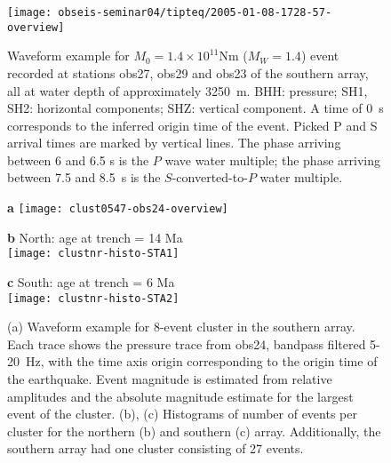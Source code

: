 \documentclass[reviewcopy]{elsarticle}
\renewcommand{\includegraphics}[2][]{\fbox{#2}}
\begin{document}
\begin{figure}
\centering
\texttt{[image: obseis-seminar04/tipteq/2005-01-08-1728-57-overview]}
\caption{Waveform example for $M_0=1.4\times 10^{11}$Nm ($M_W=1.4$)
  event recorded at stations obs27, obs29 and obs23 of the southern
  array, all at water depth of approximately 3250~m. BHH: pressure;
  SH1, SH2: horizontal components; SHZ: vertical component. A time of
  0~s corresponds to the inferred origin time of the event.  Picked P
  and S arrival times are marked by vertical lines. The phase arriving
  between 6 and 6.5 s is the $P$ wave water multiple; the phase
  arriving between 7.5 and 8.5~s is the $S$-converted-to-$P$ water
  multiple. %
}
\label{fig:waveform}
\end{figure}


\begin{figure}
{\sf \bf a}
\texttt{[image: clust0547-obs24-overview]}\\[1cm]

\parbox{0.5\textwidth}{{\sf \bf b} North: age at trench = 14 Ma \\
\texttt{[image: clustnr-histo-STA1]}}
\parbox{0.5\textwidth}{{\sf \bf c} South:  age at trench = 6 Ma\\
\texttt{[image: clustnr-histo-STA2]}}

\caption{(a) Waveform example for 8-event cluster in the southern
  array.  Each trace shows the pressure trace from obs24, bandpass
  filtered 5-20~Hz, with the time axis origin corresponding to the
  origin time of the earthquake.  Event magnitude is estimated from
  relative amplitudes and the absolute magnitude estimate for
  the largest event of the
cluster. (b), (c) Histograms of number of events per cluster for the northern
(b) and southern (c) array. Additionally, the southern array had one
cluster consisting of 27 events.}
\label{fig:clust-waveform-histo}
\end{figure}
\end{document}
